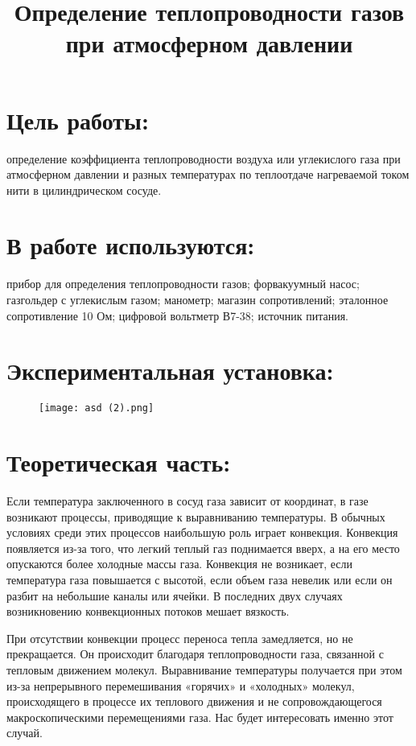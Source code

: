 \documentclass[20pt]{article}
\author{}
\title{Определение теплопроводности газов при атмосферном давлении}
\begin{document}
\parindent=1cm
\large
\maketitle
\section{Цель работы:}
определение коэффициента теплопроводности воздуха или углекислого газа при атмосферном давлении и разных температурах по теплоотдаче нагреваемой током нити в цилиндрическом сосуде.
\section{В работе используются:}
прибор для определения теплопроводности газов; форвакуумный насос; газгольдер с углекислым газом; манометр; магазин сопротивлений; эталонное сопротивление 10 Ом; цифровой вольтметр В7-38; источник питания.
\section{Экспериментальная установка:}
\begin{figure}[H]
	\centering
	\texttt{[image: asd (2).png]}
\end{figure}
\section{Теоретическая часть:}
Если температура заключенного в сосуд газа зависит от координат, в газе возникают процессы, приводящие к выравниванию температуры. В обычных условиях среди этих процессов наибольшую роль играет конвекция. Конвекция появляется из-за того, что легкий
теплый газ поднимается вверх, а на его место опускаются более холодные массы газа. Конвекция не возникает, если температура газа
повышается с высотой, если объем газа невелик или если он разбит на небольшие каналы или ячейки. В последних двух случаях возникновению конвекционных потоков мешает вязкость.

При отсутствии конвекции процесс переноса тепла замедляется, но не прекращается. Он происходит благодаря теплопроводности газа, связанной с тепловым движением молекул. Выравнивание температуры получается при этом из-за непрерывного перемешивания
«горячих» и «холодных» молекул, происходящего в процессе их теплового движения и не сопровождающегося макроскопическими перемещениями газа. Нас будет интересовать именно этот случай.
\end{document}
